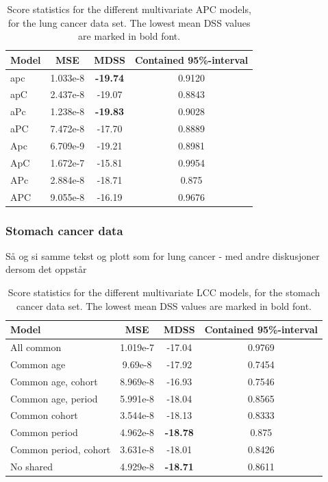\begin{table}[h!]
    \begin{center}
    \begin{tabular}{l |c c c }
        Model & MSE & MDSS & Contained 95\%-interval\\
        \hline
        apc    & 1.033e-8 & \textbf{-19.74}    & 0.9120 \\
        apC    & 2.437e-8 & -19.07   & 0.8843 \\
        aPc    & 1.238e-8 & \textbf{-19.83}  & 0.9028 \\
        aPC    & 7.472e-8 & -17.70   & 0.8889 \\
        Apc    & 6.709e-9 & -19.21   & 0.8981 \\
        ApC    & 1.672e-7 & -15.81   & 0.9954 \\
        APc    & 2.884e-8 & -18.71   & 0.875  \\
        APC    & 9.055e-8 & -16.19   & 0.9676 \\
    \end{tabular}
    \caption{Score statistics for the different multivariate APC models, for the lung cancer data set. The lowest mean DSS values are marked in bold font. }\label{tbl:mv-APC-lung}
    \end{center}
\end{table}

\newpage
\subsubsection{Stomach cancer data}
\textcolor{myDarkGreen}{Så og si samme tekst og plott som for lung cancer - med andre diskusjoner dersom det oppstår}

\begin{table}[h!]
    \begin{tabular}{l |c c c }
        Model & MSE & MDSS & Contained 95\%-interval\\
        \hline
        All common            & 1.019e-7  & -17.04    & 0.9769 \\
        Common age            &  9.69e-8 & -17.92    & 0.7454 \\
        Common age, cohort    & 8.969e-8 & -16.93    & 0.7546 \\
        Common age, period    & 5.991e-8 & -18.04    & 0.8565 \\
        Common cohort         &  3.544e-8 & -18.13   & 0.8333 \\
        Common period         &  4.962e-8 & \textbf{-18.78}   & 0.875  \\
        Common period, cohort & 3.631e-8 & -18.01    & 0.8426 \\
        No shared             &  4.929e-8 & \textbf{-18.71}    & 0.8611 \\
    \end{tabular}
    \caption{\label{tab:LCC-stomach}Score statistics for the different multivariate LCC models, for the stomach cancer data set. The lowest mean DSS values are marked in bold font. }
\end{table}

